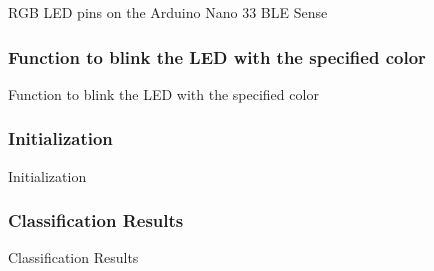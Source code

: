 \begin{code}[h!]
	    
	\caption{RGB LED pins on the Arduino Nano 33 BLE Sense}
\end{code}

\subsubsection{Function to blink the LED with the specified color}

\begin{code}[h!]
	    
	\caption{Function to blink the LED with the specified color}
\end{code}

\subsubsection{Initialization}

\begin{code}[h!]
	    
	\caption{Initialization}
	\end{code}
	
\subsubsection{Classification Results}	

\begin{code}[h!]
	    
	\caption{Classification Results}
\end{code}

